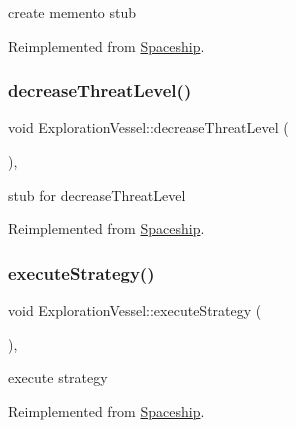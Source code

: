 create memento stub 

Reimplemented from \hyperlink{classSpaceship_a6d272f846b019dec8226ddab65648a7b}{Spaceship}.

\mbox{\label{classExplorationVessel_afac2ec0016d6934629418074e3de5950}} 
\subsubsection{\texorpdfstring{decrease\+Threat\+Level()}{decreaseThreatLevel()}}
{\footnotesize\ttfamily void Exploration\+Vessel\+::decrease\+Threat\+Level (\begin{DoxyParamCaption}{ }\end{DoxyParamCaption})\hspace{0.3cm}{\ttfamily [inline]}, {\ttfamily [virtual]}}

stub for decrease\+Threat\+Level 

Reimplemented from \hyperlink{classSpaceship_a73a1eefd211e9a2063d924ee85f0c0c7}{Spaceship}.

\mbox{\label{classExplorationVessel_a83a2bacf57d718eb75ba033bbe363b9e}} 
\subsubsection{\texorpdfstring{execute\+Strategy()}{executeStrategy()}}
{\footnotesize\ttfamily void Exploration\+Vessel\+::execute\+Strategy (\begin{DoxyParamCaption}{ }\end{DoxyParamCaption})\hspace{0.3cm}{\ttfamily [inline]}, {\ttfamily [virtual]}}

execute strategy 

Reimplemented from \hyperlink{classSpaceship}{Spaceship}.

\mbox{\label{classExplorationVessel_a3c3a641c6c249f80d68f20cf73f440f7}} 
